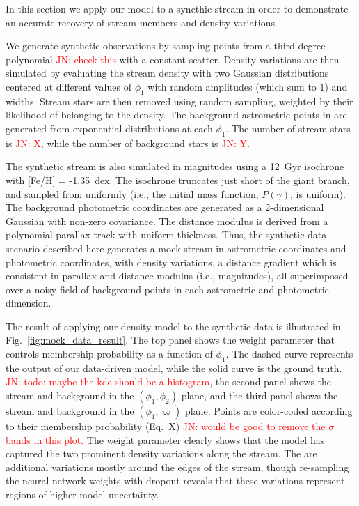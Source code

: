 \documentclass[twocolumn]{aastex631}
\newcommand{\JN}[1]{{\textcolor{red}{JN: #1}}}
\begin{document}
        In this section we apply our model to a synethic stream in order to demonstrate an accurate recovery of stream members and density variations.
    
        We generate synthetic observations by sampling points from a third degree polynomial \JN{check this} with a constant scatter. Density variations are then simulated by evaluating the stream density with two Gaussian distributions centered at different values of $\phi_1$ with random amplitudes (which sum to $1$) and widths. Stream stars are then removed using random sampling, weighted by their likelihood of belonging to the density. The background astrometric  points in are generated from exponential distributions at each $\phi_1$. The number of stream stars is \JN{X}, while the number of background stars is \JN{Y}.
    
        The synthetic stream is also simulated in magnitudes using a 12~Gyr isochrone with [Fe/H] = -1.35~dex. The isochrone truncates just short of the giant branch, and sampled from uniformly (i.e., the initial mass function, $P(\gamma)$, is uniform). The background photometric coordinates are generated as a 2-dimensional Gaussian with non-zero covariance. The distance modulus is derived from a polynomial parallax track with uniform thickness. Thus, the synthetic data scenario described here generates a mock stream in astrometric coordinates and photometric coordinates, with density variations, a distance gradient which is consistent in parallax and distance modulus (i.e., magnitudes), all superimposed over a noisy field of background points in each astrometric and photometric dimension.
    
        The result of applying our density model to the synthetic data is illustrated in Fig.~\ref{fig:mock_data_result}. The top panel shows the weight parameter that controls membership probability as a function of $\phi_1$. The dashed curve represents the output of our data-driven model, while the solid curve is the ground truth. \JN{todo: maybe the kde should be a histogram}, the second panel shows the stream and background in the $(\phi_1,\phi_2)$ plane, and the third panel shows the stream and background in the $(\phi_1,\varpi)$ plane. Points are color-coded according to their membership probability (Eq.~X) \JN{would be good to remove the $\sigma$ bands in this plot.} The weight parameter clearly shows that the model has captured the two prominent density variations along the stream. The are additional variations  mostly around the edges of the stream, though re-sampling the neural network weights with dropout reveals that these variations represent regions of higher model uncertainty. 
        
\end{document}
